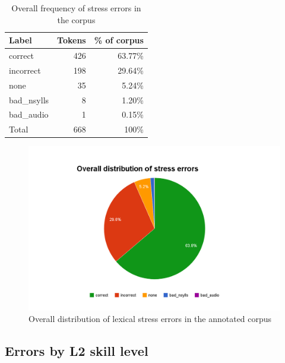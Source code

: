 		\begin{table}[htb]
			\centering
			\caption{Overall frequency of stress errors in the corpus }
			\begin{tabular}{lrr}
			\toprule
			Label & Tokens & \% of corpus \\
			\midrule
			correct	& 426	& 63.77\% \\
			incorrect &	198	& 29.64\% \\
			none	 &35 &	5.24\% \\
			bad\_nsylls	& 8	& 1.20\% \\
			bad\_audio	& 1	& 0.15\%\\
			\midrule
			Total & 668 & 100\%\\
			\bottomrule
			\end{tabular}
			\label{tab:results:overall}
		\end{table}
		
		\begin{figure}[ht]
			\centering
			\includegraphics[width=\textwidth]{img/annotation/overallPie}
			\caption{Overall distribution of lexical stress errors in the annotated corpus }
			\label{fig:results:overallpie}
		\end{figure}
		
		\subsection{Errors by L2 skill level}
		\label{sec:results:level}
		
